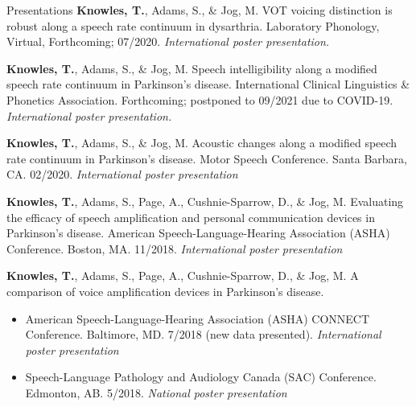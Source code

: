 \documentclass{resume} %
\begin{document}
\begin{rSection}{Presentations}
 {\bf Knowles, T.}, Adams, S., \& Jog, M. VOT voicing distinction is robust along a speech rate continuum in dysarthria. Laboratory Phonology, Virtual, Forthcoming; 07/2020.  \emph{International poster presentation.}
 
  {\bf Knowles, T.}, Adams, S., \& Jog, M. Speech intelligibility along a modified speech rate continuum in Parkinson's disease. International Clinical Linguistics \& Phonetics Association. Forthcoming; postponed to 09/2021 due to COVID-19.  \emph{International poster presentation.}
  
	{\bf Knowles, T.}, Adams, S., \& Jog, M. Acoustic changes along a modified speech rate continuum in Parkinson's disease. Motor Speech Conference. Santa Barbara, CA. 02/2020. \emph{International poster presentation}

	{\bf Knowles, T.}, Adams, S., Page, A., Cushnie-Sparrow, D., \& Jog, M. Evaluating the efficacy of speech amplification and personal communication devices in Parkinson's disease. American Speech-Language-Hearing Association (ASHA) Conference. Boston, MA. 11/2018. \emph{International poster presentation}
	
	{\bf Knowles, T.}, Adams, S., Page, A., Cushnie-Sparrow, D., \& Jog, M. A comparison of voice amplification devices in Parkinson's disease. 
		\begin{itemize}
			\renewcommand\labelitemi{$\cdot$}
			\item American Speech-Language-Hearing Association (ASHA) CONNECT Conference. Baltimore, MD. 7/2018 (new data presented). \emph{International poster presentation}
			\item Speech-Language Pathology and Audiology Canada (SAC) Conference. Edmonton, AB. 5/2018. \emph{National poster presentation}
		\end{itemize}
	

	

\end{rSection}
\end{document}
